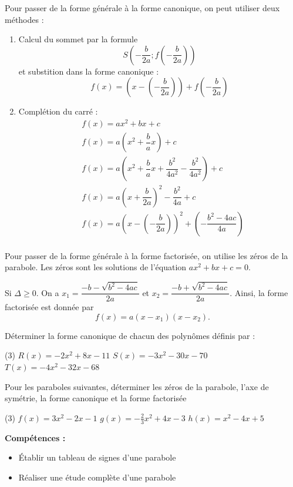 \documentclass[a4paper,12pt]{report}
\begin{document}
    \begin{rem}
    	Pour passer de la forme générale à la forme canonique, on peut utiliser deux méthodes : 
	\begin{enumerate}
		\item Calcul du sommet par la formule \[S\left(-\dfrac{b}{2a};f\left(-\dfrac{b}{2a}\right)\right)\] et substition dans la forme canonique : 
        \[f(x)=\left(x-\left(-\dfrac{b}{2a}\right)\right)+f\left(-\dfrac{b}{2a}\right)\]
\item Complétion du carré :
	\vspace{-0.8cm}
       \begin{align*}
        &f(x)=ax^2+bx+c\\
        &f(x)=a\left(x^2+\dfrac{b}{a}x\right)+c\\
        &f(x)=a\left(x^2+ \dfrac{b}{a}x+\dfrac{b^2 }{4a^2 }-\dfrac{b^2 }{4a^2 }\right)+c\\
        &f(x)=a\left(x+\dfrac{b}{2a}\right)^2 -\dfrac{b^2 }{4a}+c\\
	&f(x)=a\left(x-\left(-\dfrac{b}{2a}\right)\right)^2 +\left( -\dfrac{b^2 -4ac}{4a}\right)\\
        \end{align*}
	\end{enumerate}
    \end{rem}
    \begin{rem}
    Pour passer de la forme générale à la forme factorisée, on utilise les zéros de la parabole. Les zéros sont les solutions de l'équation $ax^2+bx+c=0$. 

Si $\Delta\geq 0$. On a $x_1=\dfrac{-b-\sqrt{b^2-4ac}}{2a}$ et $x_2=\dfrac{-b+\sqrt{b^2-4ac}}{2a}$. Ainsi, la forme factorisée est donnée par \[f(x)=a(x-x_1)(x-x_2).\]
    \end{rem}
    \begin{boiteExT}[Étude de la parabole $f(x)=3x^2+2x-1$]
	\vspace{10cm}
\end{boiteExT}
\begin{exo}
	Déterminer la forme canonique de chacun des polynômes définis par :
	\begin{tasks}(3)		
\task $R(x)=-2 x^2+8 x-11$
\task $S(x)=-3 x^2-30 x-70$
\task $T(x)=-4 x^2-32 x-68$
	\end{tasks}
\end{exo}
\begin{exo}
	Pour les paraboles suivantes, déterminer les zéros de la parabole, l'axe de symétrie, la forme canonique et la forme factorisée
	\begin{tasks}(3)
\task $f(x)=3 x^2-2 x-1$
\task $g(x)=-\frac{2}{3} x^2+4 x-3$
\task $h(x)=x^2-4 x+5$
\end{tasks}
\end{exo}
\newpage
    {\bfseries Compétences :}
 \begin{itemize}
	 \item Établir un tableau de signes d'une parabole
	 \item Réaliser une étude complète d'une parabole
 \end{itemize}
\end{document}
